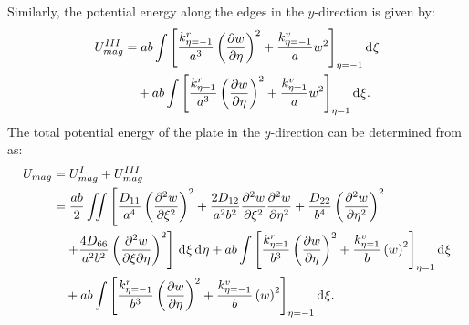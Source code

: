 \documentclass[preprint,12pt]{elsarticle}
\newcommand{\id}{\mathrm{d}\mkern1mu}
\begin{document}
Similarly, the potential energy along the edges in the \( y \)-direction is given by:  
%
\begin{equation}\label{eq:poten_energy_edgey2}  
	\begin{split}  
		U^{III}_{mag} &= ab \int \left[ \frac{k^r_{\eta=-1}}{a^3} \left( \frac{\partial w}{\partial \eta} \right)^2 + \frac{k^v_{\eta=-1}}{a} w^2 \right]_{\eta=-1} \id \xi \\  
		&\quad + ab \int \left[ \frac{k^r_{\eta=1}}{a^3} \left( \frac{\partial w}{\partial \eta} \right)^2 + \frac{k^v_{\eta=1}}{a} w^2 \right]_{\eta=1} \id \xi.  
	\end{split}  
\end{equation} 
% 
The total potential energy of the plate in the \( y \)-direction can be determined from  as:
%
\begin{equation}\label{eq:poten_energy_toly}
	\begin{split}
		U_{mag}&=U^{I}_{mag}+U^{III}_{mag}\\
		&=\frac{ab}{2} \iint \left[ \frac{D_{11}}{a^4} \left( \frac{\partial^2 w}{\partial \xi^2} \right)^2 + \frac{2 D_{12}}{a^2 b^2} \frac{\partial^2 w}{\partial \xi^2} \frac{\partial^2 w}{\partial \eta^2} + \frac{D_{22}}{b^4} \left( \frac{\partial^2 w}{\partial \eta^2} \right)^2 \right. \\
		&\quad \left.  + \frac{4 D_{66}}{a^2 b^2}\left( \frac{\partial^2 w}{\partial \xi \partial \eta} \right)^2 \right] \, \id\xi \, \id\eta+ab \int \left[ \frac{k^r_{\eta=1}}{b^3} \left( \frac{\partial w}{\partial \eta} \right)^2 + \frac{k^v_{\eta=1}}{b} \left( w \right)^2 \right]_{\eta=1} \id\xi\\
		&\quad+ab \int \left[ \frac{k^r_{\eta=-1}}{b^3} \left( \frac{\partial w}{\partial \eta} \right)^2 + \frac{k^v_{\eta=-1}}{b} \left( w \right)^2 \right]_{\eta=-1} \id\xi.
	\end{split}
\end{equation}
\end{document}
